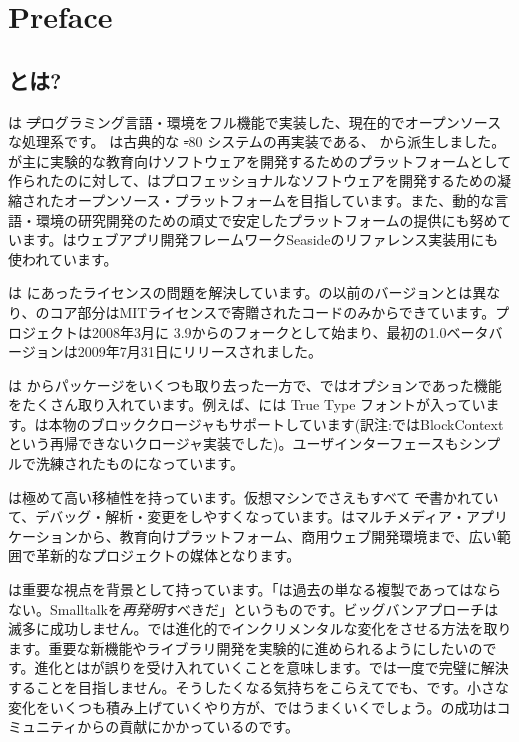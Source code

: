 \documentclass[a4paper,10pt,twoside]{book}
\begin{document}
	\sloppy
	\frontmatter
\fi
\chapter{Preface}

\section*{\pharo とは?}

\pharo は \st プログラミング言語・環境をフル機能で実装した、現在的でオープンソースな処理系です。 \pharo は古典的な \st-80 システムの再実装である、 \squeak\cite{Inga97a}から派生しました。\squeak が主に実験的な教育向けソフトウェアを開発するためのプラットフォームとして作られたのに対して、\pharo はプロフェッショナルなソフトウェアを開発するための凝縮されたオープンソース・プラットフォームを目指しています。また、動的な言語・環境の研究開発のための頑丈で安定したプラットフォームの提供にも努めています。\pharo はウェブアプリ開発フレームワークSeasideのリファレンス実装用にも使われています。

\pharo は \squeak にあったライセンスの問題を解決しています。\squeak の以前のバージョンとは異なり、\pharo のコア部分はMITライセンスで寄贈されたコードのみからできています。\pharo プロジェクトは2008年3月に \squeak 3.9からのフォークとして始まり、最初の1.0ベータバージョンは2009年7月31日にリリースされました。

\pharo は \squeak からパッケージをいくつも取り去った一方で、\squeak ではオプションであった機能をたくさん取り入れています。例えば、\pharo には True Type フォントが入っています。\pharo は本物のブロッククロージャもサポートしています(訳注:\squeak ではBlockContextという再帰できないクロージャ実装でした)。ユーザインターフェースもシンプルで洗練されたものになっています。

\pharo は極めて高い移植性を持っています。仮想マシンでさえもすべて \st で書かれていて、デバッグ・解析・変更をしやすくなっています。\pharo はマルチメディア・アプリケーションから、教育向けプラットフォーム、商用ウェブ開発環境まで、広い範囲で革新的なプロジェクトの媒体となります。

\pharo は重要な視点を背景として持っています。「\pharo は過去の単なる複製であってはならない。Smalltalkを\emph{再発明}すべきだ」というものです。ビッグバンアプローチは滅多に成功しません。\pharo では進化的でインクリメンタルな変化をさせる方法を取ります。重要な新機能やライブラリ開発を実験的に進められるようにしたいのです。進化とは\pharo が誤りを受け入れていくことを意味します。\pharo では一度で完璧に解決することを目指しません。そうしたくなる気持ちをこらえてでも、です。小さな変化をいくつも積み上げていくやり方が、\pharo ではうまくいくでしょう。\pharo の成功はコミュニティからの貢献にかかっているのです。
\end{document}
